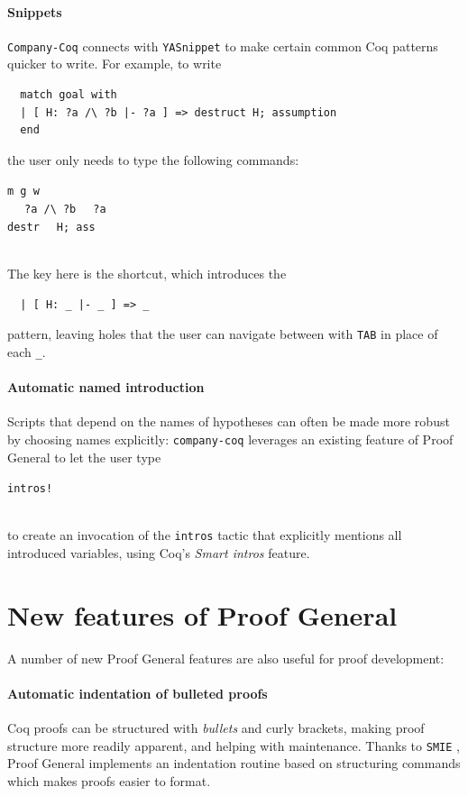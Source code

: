 \documentclass[preprint]{sigplanconf}
\newlength{\almostverbatimindentation}
\newenvironment{almostverbatim}{%
\sbox0{\texttt{\global\almostverbatimindentation=2\fontdimen2\font}}
\\[\topsep]\hspace*{\almostverbatimindentation}\begin{minipage}{0.94\linewidth}\setlength{\baselineskip}{1.5\baselineskip}%
}{%
\end{minipage}\\[\topsep]
}
\newcommand{\proofg}{Proof General\xspace}
\begin{document}
\paragraph{Snippets} \texttt{Company-Coq} connects with \texttt{YASnippet} to make certain common Coq patterns quicker to write. For example, to write
\begin{verbatim}
  match goal with
  | [ H: ?a /\ ?b |- ?a ] => destruct H; assumption
  end
\end{verbatim}
the user only needs to type the following commands:
\begin{almostverbatim}
  \verb|m g w | \keys{\return}\\
  \keys{\Alt+\shift+\return} \verb| | \keys{\tab} \verb| ?a /\ ?b | \keys{\tab} \verb| ?a | \keys{\tab}\\
  \verb|destr | \keys{\return} \verb| H; ass | \keys{\return}
\end{almostverbatim}
The key here is the \keys{\Alt+\shift+\return} shortcut, which introduces the
\begin{verbatim}
  | [ H: _ |- _ ] => _
\end{verbatim}
pattern, leaving holes that the user can navigate between with \texttt{TAB} in place of each \texttt{\_}.

\paragraph{Automatic named introduction} Scripts that depend on the names of hypotheses can often be made more robust by choosing names explicitly: \texttt{company-coq} leverages an existing feature of \proofg to let the user type
\begin{almostverbatim}
  \verb|intros! |\keys{\return}
\end{almostverbatim}
to create an invocation of the \texttt{intros} tactic that explicitly mentions all introduced variables, using Coq's \emph{Smart intros} feature.

\section*{New features of \proofg}

A number of new \proofg features are also useful for proof development:

\paragraph{Automatic indentation of bulleted proofs} Coq proofs can be structured with \emph{bullets} and curly brackets, making proof structure more readily apparent, and helping with maintenance. Thanks to \texttt{SMIE} \cite{SMIE}, \proofg implements an indentation routine based on structuring commands which makes proofs easier to format.
\end{document}
